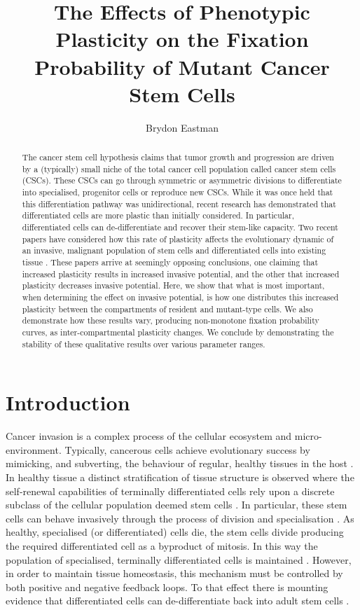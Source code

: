 \documentclass[12pt]{article}
\title{%
The Effects of Phenotypic Plasticity on the Fixation Probability of Mutant Cancer Stem Cells}
\author{Brydon Eastman}
\begin{document}
\maketitle
\begin{abstract}
The cancer stem cell hypothesis claims that tumor growth and progression are driven by a (typically) small niche of the total cancer cell population called cancer stem cells (CSCs). These CSCs can go through symmetric or asymmetric divisions to differentiate into specialised, progenitor cells or reproduce new CSCs. While it was once held that this differentiation pathway was unidirectional, recent research has demonstrated that differentiated cells are more plastic than initially considered. In particular, differentiated cells can de-differentiate and recover their stem-like capacity. Two recent papers have considered how this rate of plasticity affects the evolutionary dynamic of an invasive, malignant population of stem cells and differentiated cells into existing tissue \cite{mohammad, wodarz}. These papers arrive at seemingly opposing conclusions, one claiming that increased plasticity results in increased invasive potential, and the other that increased plasticity decreases invasive potential. Here, we show that what is most important, when determining the effect on invasive potential, is how one distributes this increased plasticity between the compartments of resident and mutant-type cells. We also demonstrate how these results vary, producing non-monotone fixation probability curves, as inter-compartmental plasticity changes. We conclude by demonstrating the stability of these qualitative results over various parameter ranges.

\end{abstract}
\section{Introduction}
Cancer invasion is a complex process of the cellular ecosystem and micro-environment. Typically, cancerous cells achieve evolutionary success by mimicking, and subverting, the behaviour of regular, healthy tissues in the host \cite{moh1}. In healthy tissue a distinct stratification of tissue structure is observed where the self-renewal capabilities of terminally differentiated cells rely upon a discrete subclass of the cellular population deemed stem cells \cite{weis2000}. In particular, these stem cells can behave invasively through the process of division and specialisation \cite{moh2}. As healthy, specialised (or differentiated) cells die, the stem cells divide producing the required differentiated cell as a byproduct of mitosis. In this way the population of specialised, terminally differentiated cells is maintained \cite{moh2, watt2000}. However, in order to maintain tissue homeostasis, this mechanism must be controlled by both positive and negative feedback loops. To that effect there is mounting evidence that differentiated cells can de-differentiate back into adult stem cells \cite{watt2000}.
\end{document}
